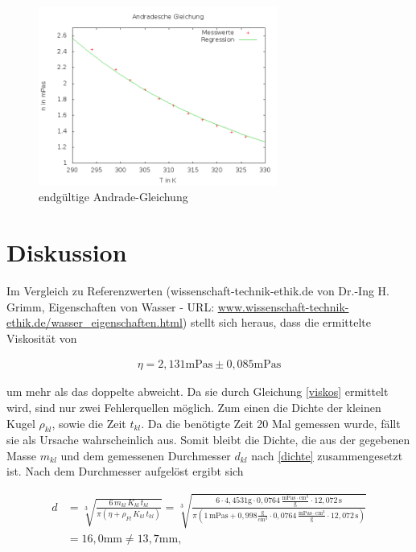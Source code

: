 \begin{figure}[H]
\includegraphics[width=0.7\textwidth] {pics/Viskos.png}
\centering
\caption{endgültige Andrade-Gleichung}
\end{figure}

\section{Diskussion}
Im Vergleich zu Referenzwerten ({wissenschaft-technik-ethik.de von Dr.-Ing H. Grimm, Eigenschaften von Wasser - URL: \href{http://www.wissenschaft-technik-ethik.de/wasser_eigenschaften.html#kap06}{www.wissenschaft-technik-ethik.de/wasser\_eigenschaften.html}})
stellt sich heraus, dass die ermittelte Viskosität von 

\begin{align*}
 \eta = 2,131 \text{mPas} \pm 0,085 \text{mPas}
\end{align*}

um mehr als das doppelte abweicht. Da sie durch Gleichung \eqref{viskos} ermittelt wird, sind nur zwei Fehlerquellen möglich. Zum einen
die Dichte der kleinen Kugel $\rho_{kl}$, sowie die Zeit $t_{kl}$. Da die benötigte Zeit 20 Mal gemessen wurde, fällt sie als Ursache
wahrscheinlich aus. Somit bleibt die Dichte, die aus der gegebenen Masse $m_{kl}$ und dem gemessenen Durchmesser $d_{kl}$ nach \eqref{dichte}
zusammengesetzt ist. Nach dem Durchmesser aufgelöst ergibt sich

\begin{align}
  \nonumber
  d &= \sqrt[3]{\frac{6\, m_{kl} \, K_{kl} \, t_{kl} }{\pi \left(\eta + \rho_{Fl} \, K_{kl} \, t_{kl}\right)}} = \sqrt[3]{\frac{6\cdot 4,4531 \text{g} \cdot 0,0764 \,\frac{\text{mPas}\cdot \text{cm}^3}{\text{g}} \cdot 12,072 \,\text{s} }{\pi \left(1\,\text{mPas} + 0,998  \frac{\text{g}}{\text{cm}^3} \cdot 0,0764 \,\frac{\text{mPas}\cdot \text{cm}^3}{\text{g}} \cdot 12,072 \,\text{s}\right)}}\\
  &= 16,0 \text{mm} \neq 13,7 \text{mm},
\end{align}

